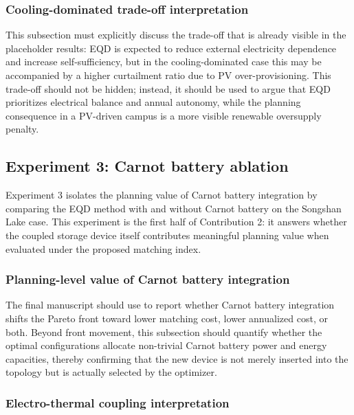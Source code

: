 \subsubsection{Cooling-dominated trade-off interpretation}

This subsection must explicitly discuss the trade-off that is already visible in the placeholder results: EQD is expected to reduce external electricity dependence and increase self-sufficiency, but in the cooling-dominated case this may be accompanied by a higher curtailment ratio due to PV over-provisioning. This trade-off should not be hidden; instead, it should be used to argue that EQD prioritizes electrical balance and annual autonomy, while the planning consequence in a PV-driven campus is a more visible renewable oversupply penalty.


\subsection{Experiment 3: Carnot battery ablation}
\label{sec:exp3}

Experiment 3 isolates the planning value of Carnot battery integration by comparing the EQD method with and without Carnot battery on the Songshan Lake case. This experiment is the first half of Contribution 2: it answers whether the coupled storage device itself contributes meaningful planning value when evaluated under the proposed matching index.

\subsubsection{Planning-level value of Carnot battery integration}

The final manuscript should use  to report whether Carnot battery integration shifts the Pareto front toward lower matching cost, lower annualized cost, or both. Beyond front movement, this subsection should quantify whether the optimal configurations allocate non-trivial Carnot battery power and energy capacities, thereby confirming that the new device is not merely inserted into the topology but is actually selected by the optimizer.

\subsubsection{Electro-thermal coupling interpretation}

